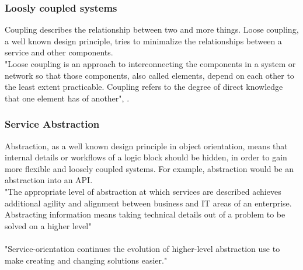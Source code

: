 \documentclass[12pt]{article}
\begin{document}
\subsubsection{Loosly coupled systems}
Coupling describes the relationship between two and more things. Loose coupling, a well known design principle,  tries to minimalize the relationships between a service and other components. \cite[page 87]{te} \\
"Loose coupling is an approach to interconnecting the components in a system or network so that those components, also called elements, depend on each other to the least extent practicable. Coupling refers to the degree of direct knowledge that one element has of another", \cite{loosecoupldef}.\newpage
\subsubsection{Service Abstraction}
Abstraction, as a well known design principle in object orientation, means that internal details or workflows of a logic block should be hidden, in order to gain more flexible and loosely coupled systems. \cite[page 87]{te} For example, abstraction would be an abstraction into an API.\\
"The appropriate level of abstraction at which services are described achieves additional agility and alignment between business and IT areas of an enterprise. Abstracting information means taking technical details out of a problem to be solved on a higher level"\cite[page 184]{grau}\\\\
"Service-orientation continues the evolution of higher-level abstraction use to make creating and changing solutions easier."\cite[page 184]{grau}
\end{document}
